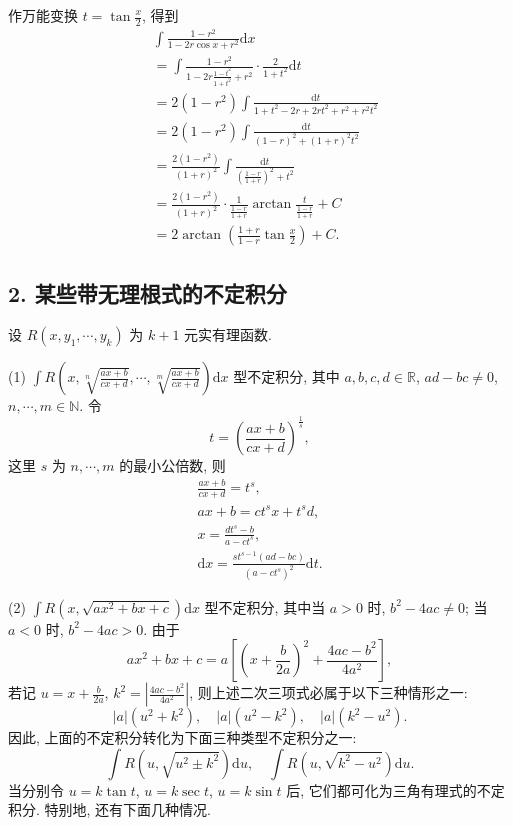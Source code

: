 \begin{solution}
作万能变换 $t=\tan\frac{x}{2}$, 得到
\begin{align*}
&\int\frac{1-r^{2}}{1-2r\cos x+r^{2}}\mathrm{d}x\\
&=\int\frac{1-r^{2}}{1-2r\frac{1-t^{2}}{1+t^{2}}+r^{2}}\cdot\frac{2}{1+t^{2}}\mathrm{d}t\\
&=2(1-r^{2})\int\frac{\mathrm{d}t}{1+t^{2}-2r+2rt^{2}+r^{2}+r^{2}t^{2}}\\
&=2(1-r^{2})\int\frac{\mathrm{d}t}{(1-r)^{2}+(1+r)^{2}t^{2}}\\
&=\frac{2(1-r^{2})}{(1+r)^{2}}\int\frac{\mathrm{d}t}{\left(\frac{1-r}{1+r}\right)^{2}+t^{2}}\\
&=\frac{2(1-r^{2})}{(1+r)^{2}}\cdot\frac{1}{\frac{1-r}{1+r}}\arctan\frac{t}{\frac{1-r}{1+r}}+C\\
&=2\arctan\left(\frac{1+r}{1-r}\tan\frac{x}{2}\right)+C.
\end{align*}
\end{solution}

\subsection*{2. 某些带无理根式的不定积分}

设 $R(x,y_{1},\cdots,y_{k})$ 为 $k+1$ 元实有理函数.

(1) $\int R\left(x,\sqrt[n]{\frac{ax+b}{cx+d}},\cdots,\sqrt[m]{\frac{ax+b}{cx+d}}\right)\mathrm{d}x$ 型不定积分, 其中 $a,b,c,d\in\mathbb{R}$, $ad-bc\neq 0$, $n,\cdots,m\in\mathbb{N}$. 令
\[
t=\left(\frac{ax+b}{cx+d}\right)^{\frac{1}{s}},
\]
这里 $s$ 为 $n,\cdots,m$ 的最小公倍数, 则
\begin{gather*}
\frac{ax+b}{cx+d}=t^{s},\\
ax+b=ct^{s}x+t^{s}d,\\
x=\frac{dt^{s}-b}{a-ct^{s}},\\
\mathrm{d}x=\frac{st^{s-1}(ad-bc)}{(a-ct^{s})^{2}}\mathrm{d}t.
\end{gather*}

(2) $\int R(x,\sqrt{ax^{2}+bx+c})\mathrm{d}x$ 型不定积分, 其中当 $a>0$ 时, $b^{2}-4ac\neq 0$; 当 $a<0$ 时, $b^{2}-4ac>0$. 由于
\[
ax^{2}+bx+c=a\left[\left(x+\frac{b}{2a}\right)^{2}+\frac{4ac-b^{2}}{4a^{2}}\right],
\]
若记 $u=x+\frac{b}{2a}$, $k^{2}=\left|\frac{4ac-b^{2}}{4a^{2}}\right|$, 则上述二次三项式必属于以下三种情形之一:
\[
|a|(u^{2}+k^{2}),\quad |a|(u^{2}-k^{2}),\quad |a|(k^{2}-u^{2}).
\]
因此, 上面的不定积分转化为下面三种类型不定积分之一:
\[
\int R(u,\sqrt{u^{2}\pm k^{2}})\mathrm{d}u,\quad \int R(u,\sqrt{k^{2}-u^{2}})\mathrm{d}u.
\]
当分别令 $u=k\tan t$, $u=k\sec t$, $u=k\sin t$ 后, 它们都可化为三角有理式的不定积分. 特别地, 还有下面几种情况.

